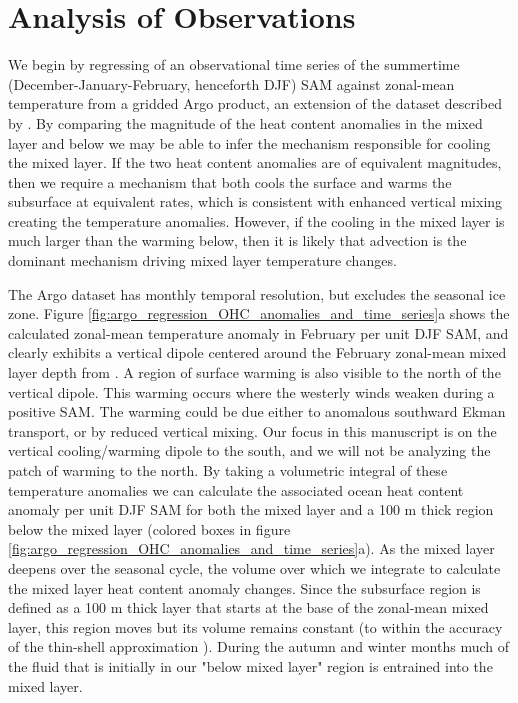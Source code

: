 \documentclass{ametsocV5}
\begin{document}

\section{Analysis of Observations} %
\label{sec:analysis_of_observations}



We begin by regressing of an observational time series of the summertime (December-January-February, henceforth DJF) SAM \citep{Marshall2003a} against zonal-mean temperature from a gridded Argo product, an extension of the dataset described by \citet{Roemmich2009}. By comparing the magnitude of the heat content anomalies in the mixed layer and below we may be able to infer the mechanism responsible for cooling the mixed layer. If the two heat content anomalies are of equivalent magnitudes, then we require a mechanism that both cools the surface and warms the subsurface at equivalent rates, which is consistent with enhanced vertical mixing creating the temperature anomalies. However, if the cooling in the mixed layer is much larger than the warming below, then it is likely that advection is the dominant mechanism driving mixed layer temperature changes.

The Argo dataset has monthly temporal resolution, but excludes the seasonal ice zone. Figure \ref{fig:argo_regression_OHC_anomalies_and_time_series}a shows the calculated zonal-mean temperature anomaly in February per unit DJF SAM, and clearly exhibits a vertical dipole centered around the February zonal-mean mixed layer depth from \citet{Holte2017}. A region of surface warming is also visible to the north of the vertical dipole. This warming occurs where the westerly winds weaken during a positive SAM. The warming could be due either to anomalous southward Ekman transport, or by reduced vertical mixing. Our focus in this manuscript is on the vertical cooling/warming dipole to the south, and we will not be analyzing the patch of warming to the north. By taking a volumetric integral of these temperature anomalies we can calculate the associated ocean heat content anomaly per unit DJF SAM for both the mixed layer and a 100 m thick region below the mixed layer (colored boxes in figure \ref{fig:argo_regression_OHC_anomalies_and_time_series}a). As the mixed layer deepens over the seasonal cycle, the volume over which we integrate to calculate the mixed layer heat content anomaly changes. Since the subsurface region is defined as a 100 m thick layer that starts at the base of the zonal-mean mixed layer, this region  moves but its volume remains constant (to within the accuracy of the thin-shell approximation \citep{Vallis2006}). During the autumn and winter months much of the fluid that is initially in our "below mixed layer" region is entrained into the mixed layer.
\end{document}

